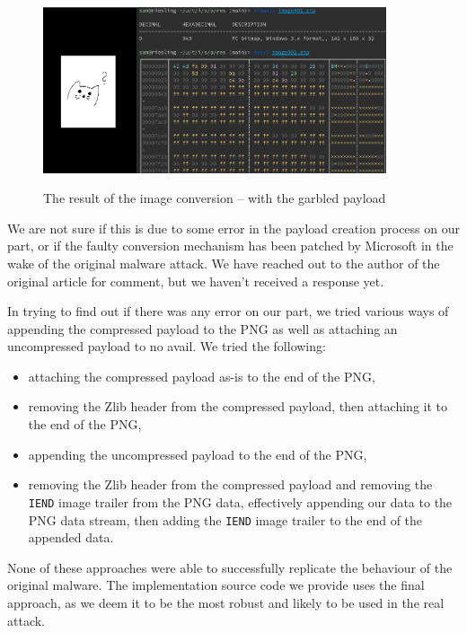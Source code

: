 \begin{figure}[H]
  \centering
  \includegraphics[width=0.9\textwidth]{figures/faulty_bmp_conversion.png}
  \label{malicious_document}
  \caption{The result of the image conversion -- with the garbled payload}
\end{figure}

We are not sure if this is due to some error in the payload creation process on our part, or if the faulty conversion
mechanism has been patched by Microsoft in the wake of the original malware attack. We have reached out to the author of
the original article for comment, but we haven't received a response yet.

In trying to find out if there was any error on our part, we tried various ways of appending the compressed payload to 
the \acrshort{PNG} as well as attaching an uncompressed payload to no avail.
We tried the following:
\begin{itemize}
    \item attaching the compressed payload as-is to the end of the \acrshort{PNG},
    \item removing the Zlib header from the compressed payload, then attaching it to the end of the \acrshort{PNG},
    \item appending the uncompressed payload to the end of the \acrshort{PNG},
    \item removing the Zlib header from the compressed payload and removing the \verb+IEND+ image trailer from the
        \acrshort{PNG} data, effectively appending our data to the \acrshort{PNG} data stream, then adding the
        \verb+IEND+ image trailer to the end of the appended data.
\end{itemize}

None of these approaches were able to successfully replicate the behaviour of the original malware. The implementation
source code we provide uses the final approach, as we deem it to be the most robust and likely to be used in the real
attack.

